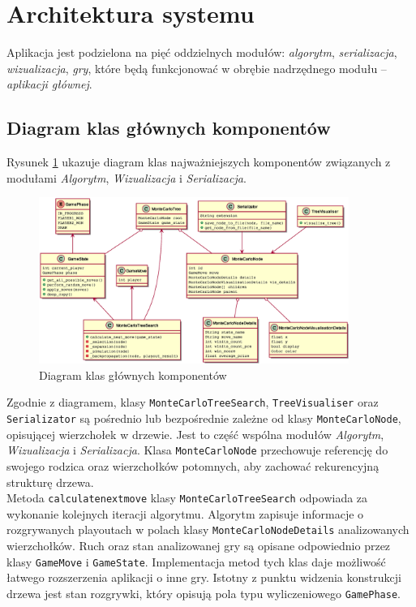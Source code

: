 \documentclass{article}
\let\oldsection\section
\renewcommand\section{\clearpage\oldsection}
\newcommand{\code}[1]{\colorbox{light-gray}{\texttt{#1}}}
\newcommand{\modulename}[1]{\textit{#1}}
\begin{document}
\section{Architektura systemu}
Aplikacja jest podzielona na pięć oddzielnych modułów: \modulename{algorytm}, \modulename{serializacja}, \modulename{wizualizacja}, \modulename{gry}, które będą funkcjonować w obrębie nadrzędnego modułu – \modulename{aplikacji głównej}. 


\subsection{Diagram klas głównych komponentów}

\noindent Rysunek \ref{rys:umldiagrammain} ukazuje diagram klas najważniejszych komponentów związanych z modułami \modulename{Algorytm}, \modulename{Wizualizacja} i \modulename{Serializacja}.

\begin{figure}[h]
	\centering
	\includegraphics[width=0.9\textwidth]{umldiagram}
	\caption{Diagram klas głównych komponentów}
	\label{rys:umldiagrammain}
\end{figure}
\noindent Zgodnie z diagramem, klasy \code{MonteCarloTreeSearch}, \code{TreeVisualiser} oraz \code{Serializator} są pośrednio lub bezpośrednie zależne od klasy \code{MonteCarloNode}, opisującej wierzchołek w drzewie. Jest to część wspólna modułów \modulename{Algorytm}, \modulename{Wizualizacja} i \modulename{Serializacja}. Klasa \code{MonteCarloNode} przechowuje referencję do swojego rodzica oraz wierzchołków potomnych, aby zachować rekurencyjną strukturę drzewa.\\

\noindent Metoda \code{calculate\textunderscore next\textunderscore move} klasy \code{MonteCarloTreeSearch} odpowiada za wykonanie kolejnych iteracji algorytmu. Algorytm zapisuje informacje o rozgrywanych playoutach w polach klasy \code{MonteCarloNodeDetails} analizowanych wierzchołków. Ruch oraz stan analizowanej gry są opisane odpowiednio przez klasy \code{GameMove} i \code{GameState}. Implementacja metod tych klas daje możliwość łatwego rozszerzenia aplikacji o inne gry. Istotny z punktu widzenia konstrukcji drzewa jest stan rozgrywki, który opisują pola typu wyliczeniowego \code{GamePhase}.
\end{document}
